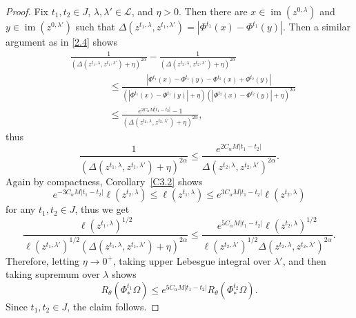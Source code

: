 \documentclass[reqno,centertags,12pt]{amsart}
\theoremstyle{definition}
\numberwithin{equation}{section}
\newcommand{\abs}[1]{\left\lvert#1\right\rvert}
\newcommand{\tht}{\theta}
\begin{document}
\begin{proof}
    Fix $t_{1},t_{2}\in J$, $\lambda,\lambda'\in\mathcal{L}$, and $\eta>0$.
    Then there are $x\in\operatorname{im}(z^{0,\lambda})$ and
    $y\in\operatorname{im}(z^{0,\lambda'})$ such that
    $\Delta(z^{t_{1},\lambda},z^{t_{1},\lambda'}) = \abs{\Phi^{t_{1}}(x) - \Phi^{t_{1}}(y)}$.
    Then a similar argument as in \eqref{2.4} shows
    \begin{align*}
        &\frac{1}{\left(
            \Delta(z^{t_{1},\lambda},z^{t_{1},\lambda'}) + \eta
        \right)^{2\alpha}}
        - \frac{1}{\left(
            \Delta(z^{t_{2},\lambda},z^{t_{2},\lambda'}) + \eta
        \right)^{2\alpha}}
        \\&\quad\quad\quad\quad
        \leq \frac{\abs{\Phi^{t_{1}}(x) - \Phi^{t_{1}}(y)
        - \Phi^{t_{2}}(x) + \Phi^{t_{2}}(y)}}
        {\left(\abs{\Phi^{t_{1}}(x) - \Phi^{t_{1}}(y)} + \eta\right)
        \left(\abs{\Phi^{t_{2}}(x) - \Phi^{t_{2}}(y)} + \eta\right)^{2\alpha}}
        \\&\quad\quad\quad\quad
        \leq \frac{e^{2C_{\alpha}M\abs{t_{1} - t_{2}}} - 1}
        {(\Delta(z^{t_{2},\lambda},z^{t_{2},\lambda'}) + \eta)^{2\alpha}},
    \end{align*}
    thus
    \begin{equation}\label{3.7}
        \frac{1}{\left(
            \Delta(z^{t_{1},\lambda},z^{t_{1},\lambda'}) + \eta
        \right)^{2\alpha}}
        \leq \frac{e^{2C_{\alpha}M\abs{t_{1} - t_{2}}}}
        {\Delta(z^{t_{2},\lambda},z^{t_{2},\lambda'})^{2\alpha}}.
    \end{equation}
    Again by compactness, Corollary~\ref{C3.2} shows
    \[
        e^{-3C_{\alpha}M\abs{t_{1} - t_{2}}}\ell(z^{t_{2},\lambda})
        \leq \ell(z^{t_{1},\lambda}) \leq
        e^{3C_{\alpha}M\abs{t_{1} - t_{2}}}\ell(z^{t_{2},\lambda})
    \]
    for any $t_{1},t_{2}\in J$, thus we get
    \begin{equation}\label{3.8}
        \frac{\ell(z^{t_{1},\lambda})^{1/2}}
        {\ell(z^{t_{1},\lambda'})^{1/2}\left(
            \Delta(z^{t_{1},\lambda},z^{t_{1},\lambda'}) + \eta
        \right)^{2\alpha}}
        \leq \frac{e^{5C_{\alpha}M\abs{t_{1} - t_{2}}}\ell(z^{t_{2},\lambda})^{1/2}}
        {\ell(z^{t_{2},\lambda'})^{1/2}
        \Delta(z^{t_{2},\lambda},z^{t_{2},\lambda'})^{2\alpha}}.
    \end{equation}
    Therefore, letting $\eta\to 0^{+}$, taking upper Lebesgue integral over $\lambda'$,
    and then taking supremum over $\lambda$ shows
    \begin{equation}\label{3.9}
        R_{\tht}(\Phi_{*}^{t_{1}}\Omega)
        \leq e^{5C_{\alpha}M\abs{t_{1} - t_{2}}}R_{\tht}(\Phi_{*}^{t_{2}}\Omega).
    \end{equation}
    Since $t_{1},t_{2}\in J$, the claim follows.
\end{proof}
\end{document}
